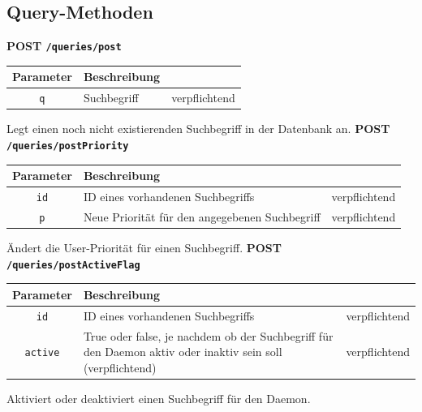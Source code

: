 \def \tweite {10.1cm}
\subsection*{Query-Methoden}
\textbf{POST \texttt{/queries/post}}
\begin{table}[h!]
\begin{tabular}{| c | p{\tweite} | l |}
\hline
	\textbf{Parameter} & \textbf{Beschreibung} &  \\
\hline \hline
 	\texttt{q} & Suchbegriff & verpflichtend \\
\hline
\end{tabular}
\end{table}
\newline
Legt einen noch nicht existierenden Suchbegriff in der Datenbank an.
\newline
 \newline
\textbf{POST \texttt{/queries/postPriority}}
\begin{table}[h!]
\begin{tabular}{| c | p{\tweite} | l |}
\hline
	\textbf{Parameter} & \textbf{Beschreibung} &  \\
\hline \hline
 	\texttt{id} & ID eines vorhandenen Suchbegriffs & verpflichtend \\
\hline
 	\texttt{p} & Neue Priorität für den angegebenen Suchbegriff & verpflichtend \\
\hline
\end{tabular}
\end{table}
\newline
Ändert die User-Priorität für einen Suchbegriff.
\newline
 \newline
\textbf{POST \texttt{/queries/postActiveFlag}}
\begin{table}[h!]
\begin{tabular}{| c | p{\tweite} | l |}
\hline
	\textbf{Parameter} & \textbf{Beschreibung} &  \\
\hline \hline
 	\texttt{id} & ID eines vorhandenen Suchbegriffs & verpflichtend \\
\hline
 	\texttt{active} & True oder false, je nachdem ob der Suchbegriff für den Daemon aktiv oder inaktiv sein soll (verpflichtend) & verpflichtend \\
\hline
\end{tabular}
\end{table}
\newline
Aktiviert oder deaktiviert einen Suchbegriff für den Daemon.
\newpage

